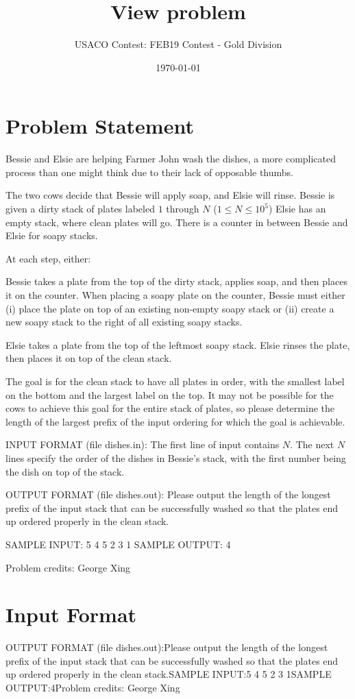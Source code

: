 \documentclass[12pt]{article}
\title{View problem}
\author{USACO Contest: FEB19 Contest - Gold Division}
\date{\today}
\begin{document}
\maketitle

\section*{Problem Statement}

Bessie and Elsie are helping Farmer John wash the dishes, a more complicated
process than one might think due to their lack of opposable thumbs.

The two cows decide that Bessie will apply soap, and Elsie will rinse. Bessie is
given a dirty stack of plates labeled $1$ through $N$ ($1 \leq N \leq 10^5$)
Elsie has an empty stack, where clean plates will go. There is a counter in
between Bessie and Elsie for soapy stacks.

At each step, either:

Bessie takes a plate from the top of the dirty stack, applies soap, and then
places it on the counter. When placing a soapy plate on the counter, Bessie must
either (i) place the plate on top of an existing non-empty soapy stack or (ii)
create a new soapy stack to the right of all existing soapy stacks.

Elsie takes a plate from the top of the leftmost soapy stack. Elsie rinses the
plate, then places it on top of the clean stack.

The goal is for the clean stack to have all plates in order, with the smallest
label on the bottom and the largest label on the top.  It may not be possible
for the cows to achieve this goal for the entire stack of plates, so please
determine the length of the largest prefix of the input ordering for which the
goal is achievable.

INPUT FORMAT (file dishes.in):
The first line of input contains $N$.  The next $N$ lines specify the order of
the dishes in Bessie's stack, with the first number being the dish on top of the
stack.

OUTPUT FORMAT (file dishes.out):
Please output the length of the longest prefix of the input stack that can be
successfully washed so that the plates end up ordered properly in the clean
stack.

SAMPLE INPUT:
5
4
5
2
3
1
SAMPLE OUTPUT: 
4


Problem credits: George Xing



\section*{Input Format}
OUTPUT FORMAT (file dishes.out):Please output the length of the longest prefix of the input stack that can be
successfully washed so that the plates end up ordered properly in the clean
stack.SAMPLE INPUT:5
4
5
2
3
1SAMPLE OUTPUT:4Problem credits: George Xing
\end{document}
